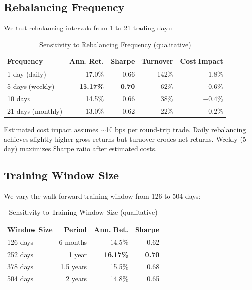 \documentclass[conference]{IEEEtran}
\begin{document}
\subsection{Rebalancing Frequency}
We test rebalancing intervals from 1 to 21 trading days:

\begin{table}[!t]
\caption{Sensitivity to Rebalancing Frequency (qualitative)}
\label{tab:rebal}
\centering
\begin{tabular}{lrrrr}
\toprule
\textbf{Frequency} & \textbf{Ann. Ret.} & \textbf{Sharpe} & \textbf{Turnover} & \textbf{Cost Impact} \\
\midrule
1 day (daily)     & 17.0\% & 0.66 & 142\% & $-1.8\%$ \\
5 days (weekly)   & \textbf{16.17\%} & \textbf{0.70} & 62\% & $-0.6\%$ \\
10 days           & 14.5\% & 0.66 & 38\% & $-0.4\%$ \\
21 days (monthly) & 13.0\% & 0.62 & 22\% & $-0.2\%$ \\
\bottomrule
\end{tabular}
\end{table}

Estimated cost impact assumes $\sim$10 bps per round-trip trade. Daily rebalancing achieves slightly higher gross returns but turnover erodes net returns. Weekly (5-day) maximizes Sharpe ratio after estimated costs.

\subsection{Training Window Size}
We vary the walk-forward training window from 126 to 504 days:

\begin{table}[!t]
\caption{Sensitivity to Training Window Size (qualitative)}
\label{tab:window}
\centering
\begin{tabular}{lrrr}
\toprule
\textbf{Window Size} & \textbf{Period} & \textbf{Ann. Ret.} & \textbf{Sharpe} \\
\midrule
126 days & 6 months  & 14.5\% & 0.62 \\
252 days & 1 year    & \textbf{16.17\%} & \textbf{0.70} \\
378 days & 1.5 years & 15.5\% & 0.68 \\
504 days & 2 years   & 14.8\% & 0.65 \\
\bottomrule
\end{tabular}
\end{table}
\end{document}
